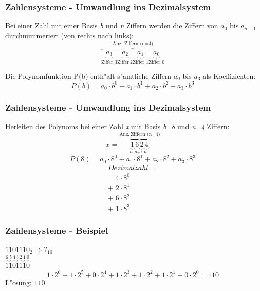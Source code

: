 \documentclass{beamer}
\begin{document}
\frame 
{
	\frametitle{Zahlensysteme - Umwandlung ins Dezimalsystem}
	
		
	Bei einer Zahl mit einer Basis \textit{b} und \textit{n} Ziffern werden die Ziffern von \textit{$a_0$} bis \textit{$a_{n-1}$} durchnummeriert (von rechts nach links):
	\begin{displaymath}	
	\overbrace{\underbrace{a_3}_\text{Ziffer 3} \underbrace{a_2}_\text{Ziffer 2} \underbrace{a_1}_\text{Ziffer 1} \underbrace{a_0}_\text{Ziffer 0}}^\text{Anz. Ziffern (n=4)}
	\end{displaymath}		 
	
	Die Polynomfunktion P(b) enth"alt s"amtliche Ziffern {\it $a_0$} bis {\it $a_{3}$} als Koeffizienten:
	\begin{displaymath}
	P(b)= a_0 \cdot b^0+ a_1 \cdot b^1 + a_2 \cdot b^2 + a_3 \cdot b^3
	\end{displaymath}		
}

\frame
{
	\frametitle{Zahlensysteme - Umwandlung ins Dezimalsystem}
	Herleiten des Polynoms bei einer Zahl \textit{x} mit Basis \textit{b=8} und \textit{n=4} Ziffern: 
	\begin{displaymath}	
	x = \overbrace{\underbrace{1}_\text{$a_3$} \underbrace{6}_\text{$a_2$} \underbrace{2}_\text{$a_1$} \underbrace{4}_\text{$a_0$}}^\text{Anz. Ziffern (n=4)}
	\end{displaymath}			
	\vspace{1mm}
	\begin{displaymath}
	P(8)= a_0 \cdot 8^0+ a_1 \cdot 8^1 + a_2 \cdot 8^2 + a_3 \cdot 8^3
	\end{displaymath}	
	\vspace{1mm}
	\begin{displaymath}
	\begin{array}{ll}
	Dezimalzahl = \\
	\;\;\;\: 4 \cdot 8^0 \\
	+\; 2 \cdot 8^1 \\
	+\; 6 \cdot 8^2 \\
	+\; 1 \cdot 8^3
	\end{array}
	\end{displaymath}
}

\frame
{
	\frametitle{Zahlensysteme - Beispiel}
	$1101110_{2} \Rightarrow ?_{10}$\\
	\vspace{3mm}
	$\overbrace{1}^\text{6} \overbrace{1}^\text{5} \overbrace{0}^\text{4} \overbrace{1}^\text{3} \overbrace{1}^\text{2} \overbrace{1}^\text{1} \overbrace{0}^\text{0}$
	\vspace{3mm}
	\begin{displaymath}
	1 \cdot 2^6 + 1 \cdot 2^5 + 0 \cdot 2^4 + 1 \cdot 2^3 + 1 \cdot 2^2 + 1 \cdot 2^1 + 0 \cdot 2^0 = 110
	\end{displaymath}
	\vspace{3mm}
	L"osung: $110$
}
\end{document}
